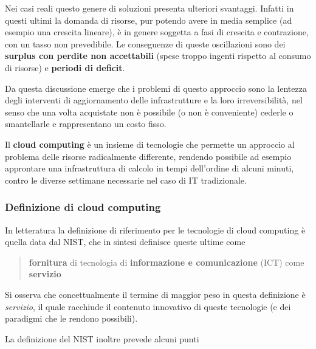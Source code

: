 \documentclass[italian,]{article}
\begin{document}
Nei casi reali questo genere di soluzioni presenta ulteriori svantaggi.
Infatti in questi ultimi la domanda di risorse, pur potendo avere in
media semplice (ad esempio una crescita lineare), è in genere soggetta a
fasi di crescita e contrazione, con un tasso non prevedibile. Le
conseguenze di queste oscillazioni sono dei \textbf{surplus con perdite
non accettabili} (spese troppo ingenti rispetto al consumo di risorse) e
\textbf{periodi di deficit}.

Da questa discussione emerge che i problemi di questo approccio sono la
lentezza degli interventi di aggiornamento delle infrastrutture e la
loro irreversibilità, nel senso che una volta acquistate non è possibile
(o non è conveniente) cederle o smantellarle e rappresentano un costo
fisso.

Il \textbf{cloud computing} è un insieme di tecnologie che permette un
approccio al problema delle risorse radicalmente differente, rendendo
possibile ad esempio approntare una infrastruttura di calcolo in tempi
dell'ordine di alcuni minuti, contro le diverse settimane necessarie nel
caso di IT tradizionale.

\subsubsection{Definizione di cloud
computing}\label{definizione-di-cloud-computing}

In letteratura la definizione di riferimento per le tecnologie di cloud
computing è quella data dal NIST, che in sintesi definisce queste ultime
come

\begin{quote}
\textbf{fornitura} di tecnologia di \textbf{informazione e
comunicazione} (ICT) come \textbf{servizio}
\end{quote}

Si osserva che concettualmente il termine di maggior peso in questa
definizione è \emph{servizio}, il quale racchiude il contenuto
innovativo di queste tecnologie (e dei paradigmi che le rendono
possibili).

La definizione del NIST inoltre prevede alcuni punti
\end{document}
